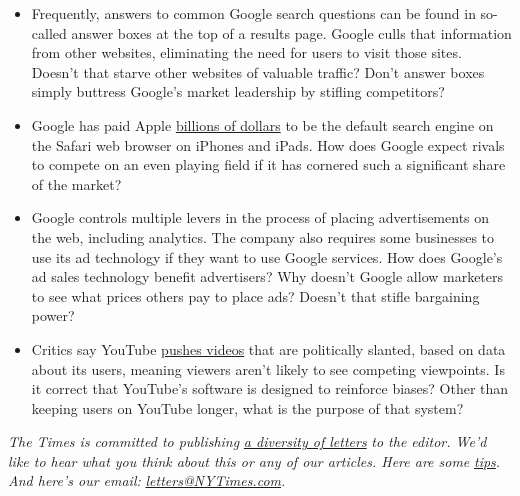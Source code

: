 \begin{itemize}
\tightlist
\item
  Frequently, answers to common Google search questions can be found in
  so-called answer boxes at the top of a results page. Google culls that
  information from other websites, eliminating the need for users to
  visit those sites. Doesn't that starve other websites of valuable
  traffic? Don't answer boxes simply buttress Google's market leadership
  by stifling competitors?
\end{itemize}

\begin{itemize}
\tightlist
\item
  Google has paid Apple
  \href{https://www.theverge.com/2020/7/1/21310591/apple-google-search-engine-safari-iphone-deal-billions-regulation-antitrust}{billions
  of dollars} to be the default search engine on the Safari web browser
  on iPhones and iPads. How does Google expect rivals to compete on an
  even playing field if it has cornered such a significant share of the
  market?
\end{itemize}

\begin{itemize}
\tightlist
\item
  Google controls multiple levers in the process of placing
  advertisements on the web, including analytics. The company also
  requires some businesses to use its ad technology if they want to use
  Google services. How does Google's ad sales technology benefit
  advertisers? Why doesn't Google allow marketers to see what prices
  others pay to place ads? Doesn't that stifle bargaining power?
\end{itemize}

\begin{itemize}
\tightlist
\item
  Critics say YouTube
  \href{https://www.nytimes3xbfgragh.onion/2020/07/13/technology/google-ads-antitrust.html}{pushes
  videos} that are politically slanted, based on data about its users,
  meaning viewers aren't likely to see competing viewpoints. Is it
  correct that YouTube's software is designed to reinforce biases? Other
  than keeping users on YouTube longer, what is the purpose of that
  system?
\end{itemize}

\emph{The Times is committed to publishing}
\href{https://www.nytimes3xbfgragh.onion/2019/01/31/opinion/letters/letters-to-editor-new-york-times-women.html}{\emph{a
diversity of letters}} \emph{to the editor. We'd like to hear what you
think about this or any of our articles. Here are some}
\href{https://help.nytimes3xbfgragh.onion/hc/en-us/articles/115014925288-How-to-submit-a-letter-to-the-editor}{\emph{tips}}\emph{.
And here's our email:}
\href{mailto:letters@NYTimes.com}{\emph{letters@NYTimes.com}}\emph{.}

